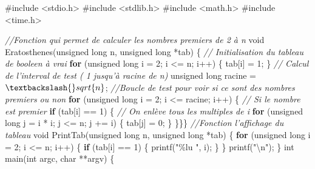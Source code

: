\documentclass[
    ]{article}
\newenvironment{Shaded}{}{}
\newcommand{\CommentTok}[1]{\textcolor[rgb]{0.38,0.63,0.69}{\textit{#1}}}
\newcommand{\ControlFlowTok}[1]{\textcolor[rgb]{0.00,0.44,0.13}{\textbf{#1}}}
\newcommand{\DataTypeTok}[1]{\textcolor[rgb]{0.56,0.13,0.00}{#1}}
\newcommand{\DecValTok}[1]{\textcolor[rgb]{0.25,0.63,0.44}{#1}}
\newcommand{\ImportTok}[1]{#1}
\newcommand{\NormalTok}[1]{#1}
\newcommand{\PreprocessorTok}[1]{\textcolor[rgb]{0.74,0.48,0.00}{#1}}
\newcommand{\SpecialCharTok}[1]{\textcolor[rgb]{0.25,0.44,0.63}{#1}}
\newcommand{\StringTok}[1]{\textcolor[rgb]{0.25,0.44,0.63}{#1}}
\begin{document}
\begin{Shaded}
\begin{Highlighting}[]
\PreprocessorTok{\#include }\ImportTok{\textless{}stdio.h\textgreater{}}
\PreprocessorTok{\#include }\ImportTok{\textless{}stdlib.h\textgreater{}}
\PreprocessorTok{\#include }\ImportTok{\textless{}math.h\textgreater{}}
\PreprocessorTok{\#include }\ImportTok{\textless{}time.h\textgreater{}}

\CommentTok{//Fonction qui permet de calculer les nombres premiers de 2 à n}
\DataTypeTok{void}\NormalTok{ Eratosthenes(}\DataTypeTok{unsigned} \DataTypeTok{long}\NormalTok{ n, }\DataTypeTok{unsigned} \DataTypeTok{long}\NormalTok{ *tab) \{}
\CommentTok{// Initialisation du tableau de booleen à vrai}
    \ControlFlowTok{for}\NormalTok{ (}\DataTypeTok{unsigned} \DataTypeTok{long}\NormalTok{ i = }\DecValTok{2}\NormalTok{; i \textless{}= n; i++) \{}
\NormalTok{        tab[i] = }\DecValTok{1}\NormalTok{;}
\NormalTok{    \}}
\CommentTok{    // Calcul de l'interval de test ( 1 jusqu'à racine de n)}
    \DataTypeTok{unsigned} \DataTypeTok{long}\NormalTok{ racine = $\textbackslash{}sqrt\{n\}$;}
    \CommentTok{   //Boucle de test pour voir si ce sont des nombres premiers ou non}
    \ControlFlowTok{for}\NormalTok{ (}\DataTypeTok{unsigned} \DataTypeTok{long}\NormalTok{ i = }\DecValTok{2}\NormalTok{; i \textless{}= racine; i++) \{}
        \CommentTok{// Si le nombre est premier}
        \ControlFlowTok{if}\NormalTok{ (tab[i] == }\DecValTok{1}\NormalTok{) \{}
            \CommentTok{ // On enlève tous les multiples de i}
            \ControlFlowTok{for}\NormalTok{ (}\DataTypeTok{unsigned} \DataTypeTok{long}\NormalTok{ j = i * i; j \textless{}= n; j += i) \{}
\NormalTok{                tab[j] = }\DecValTok{0}\NormalTok{;}
\NormalTok{            \}}
\NormalTok{    \}\}\}}
\CommentTok{//Fonction l'affichage du tableau}
\DataTypeTok{void}\NormalTok{ PrintTab(}\DataTypeTok{unsigned} \DataTypeTok{long}\NormalTok{ n, }\DataTypeTok{unsigned} \DataTypeTok{long}\NormalTok{ *tab) \{}
    \ControlFlowTok{for}\NormalTok{ (}\DataTypeTok{unsigned} \DataTypeTok{long}\NormalTok{ i = }\DecValTok{2}\NormalTok{; i \textless{}= n; i++) \{}
        \ControlFlowTok{if}\NormalTok{ (tab[i] == }\DecValTok{1}\NormalTok{) \{}
\NormalTok{            printf(}\StringTok{"\%lu "}\NormalTok{, i);}
\NormalTok{        \}}
\NormalTok{    \}}
\NormalTok{    printf(}\StringTok{"}\SpecialCharTok{\textbackslash{}n}\StringTok{"}\NormalTok{);}
\NormalTok{\}}
\DataTypeTok{int}\NormalTok{ main(}\DataTypeTok{int}\NormalTok{ argc, }\DataTypeTok{char}\NormalTok{ **argv) \{}

\end{Highlighting}
\end{Shaded}
\end{document}
